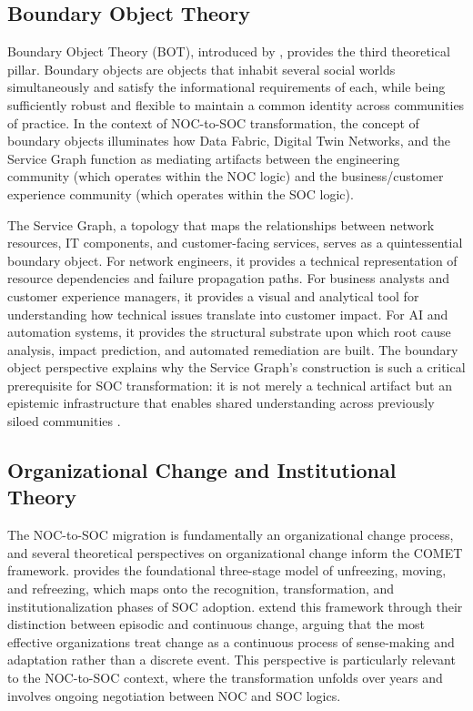 \documentclass[12pt,a4paper]{article}
\begin{document}
\subsection{Boundary Object Theory}

Boundary Object Theory (BOT), introduced by \citet{star1989institutional}, provides the third theoretical pillar. Boundary objects are objects that inhabit several social worlds simultaneously and satisfy the informational requirements of each, while being sufficiently robust and flexible to maintain a common identity across communities of practice. In the context of NOC-to-SOC transformation, the concept of boundary objects illuminates how Data Fabric, Digital Twin Networks, and the Service Graph function as mediating artifacts between the engineering community (which operates within the NOC logic) and the business/customer experience community (which operates within the SOC logic).

The Service Graph, a topology that maps the relationships between network resources, IT components, and customer-facing services, serves as a quintessential boundary object. For network engineers, it provides a technical representation of resource dependencies and failure propagation paths. For business analysts and customer experience managers, it provides a visual and analytical tool for understanding how technical issues translate into customer impact. For AI and automation systems, it provides the structural substrate upon which root cause analysis, impact prediction, and automated remediation are built. The boundary object perspective explains why the Service Graph's construction is such a critical prerequisite for SOC transformation: it is not merely a technical artifact but an epistemic infrastructure that enables shared understanding across previously siloed communities \citep{vandeven2007engaged}.

\subsection{Organizational Change and Institutional Theory}

The NOC-to-SOC migration is fundamentally an organizational change process, and several theoretical perspectives on organizational change inform the COMET framework. \citet{lewin1947frontiers} provides the foundational three-stage model of unfreezing, moving, and refreezing, which maps onto the recognition, transformation, and institutionalization phases of SOC adoption. \citet{weick1999organizational} extend this framework through their distinction between episodic and continuous change, arguing that the most effective organizations treat change as a continuous process of sense-making and adaptation rather than a discrete event. This perspective is particularly relevant to the NOC-to-SOC context, where the transformation unfolds over years and involves ongoing negotiation between NOC and SOC logics.
\end{document}
